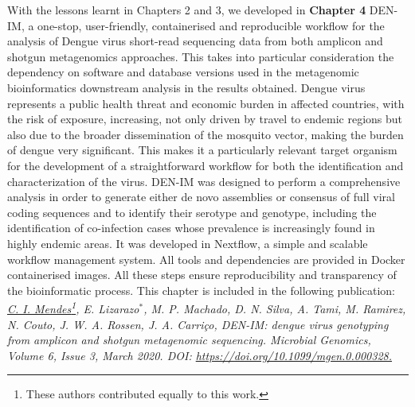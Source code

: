 With the lessons learnt in Chapters 2 and 3, we developed in \textbf{Chapter 4} DEN-IM, a one-stop, user-friendly, containerised and reproducible workflow for the analysis of Dengue virus short-read sequencing data from both amplicon and shotgun metagenomics approaches. This takes into particular consideration the dependency on software and database versions used in the metagenomic bioinformatics downstream analysis in the results obtained. Dengue virus represents a public health threat and economic burden in affected countries, with the risk of exposure, increasing, not only driven by travel to endemic regions but also due to the broader dissemination of the mosquito vector, making the burden of dengue very significant. This makes it a particularly relevant target organism for the development of a straightforward workflow for both the identification and characterization of the virus. DEN-IM was designed to perform a comprehensive analysis in order to generate either de novo assemblies or consensus of full viral coding sequences and to identify their serotype and genotype, including the identification of co-infection cases whose prevalence is increasingly found in highly endemic areas. It was developed in Nextflow,  a simple and scalable workflow management system. All tools and dependencies are provided in Docker containerised images. All these steps ensure reproducibility and transparency of the bioinformatic process. This chapter is included in the following publication: \textit{\underline{C. I. Mendes}\footnote[1]{These authors contributed equally to this work.}, E. Lizarazo$^*$, M. P. Machado, D. N. Silva, A. Tami, M. Ramirez, N. Couto, J. W. A. Rossen, J. A. Carriço, DEN-IM: dengue virus genotyping from amplicon and shotgun metagenomic sequencing. Microbial Genomics, Volume 6, Issue 3, March 2020. DOI: \url{https://doi.org/10.1099/mgen.0.000328.}}

